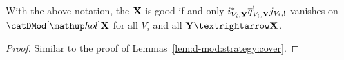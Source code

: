 \begin{Lem}\label{lem:d-mod:strategy:cover-by-relative-compactifications}
    With the above notation, the $\mathbf X$ is good if and only $i_{V_i,\mathbf Y}^* \overline q_{V_i,\mathbf Y}^! j_{V_i,!}$ vanishes on $\catDModHol{\stack X}$ for all $V_i$ and all $\stack Y → \stack X$.
\end{Lem}

\begin{proof}
    Similar to the proof of Lemmas~\ref{lem:d-mod:strategy:cover}.
\end{proof}
